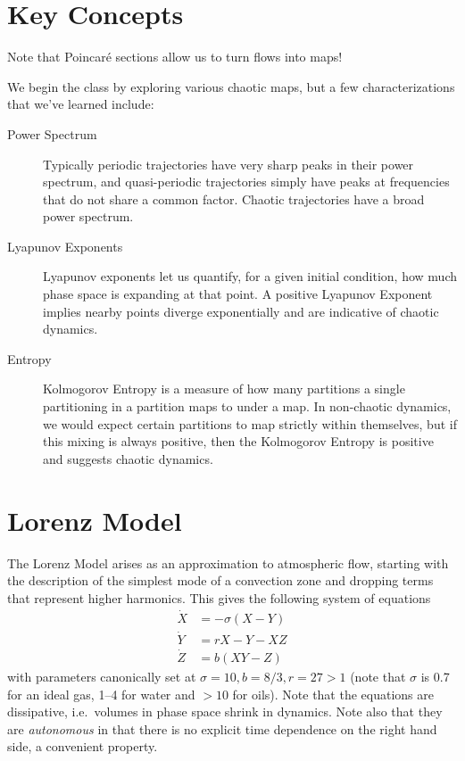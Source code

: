 \documentclass[10pt]{article}
\begin{document}
\pagestyle{fancy}
\cfoot{\thepage/\pageref{LastPage}}

\tableofcontents
\clearpage

\section{Key Concepts}

Note that Poincar\'e sections allow us to turn flows into maps!

We begin the class by exploring various chaotic maps, but a few
characterizations that we've learned include:
\begin{description}
    \item[Power Spectrum] Typically periodic trajectories have very sharp peaks
        in their power spectrum, and quasi-periodic trajectories simply have
        peaks at frequencies that do not share a common factor. Chaotic
        trajectories have a broad power spectrum.

    \item[Lyapunov Exponents] Lyapunov exponents let us quantify, for a given
        initial condition, how much phase space is expanding at that point. A
        positive Lyapunov Exponent implies nearby points diverge exponentially
        and are indicative of chaotic dynamics.

    \item[Entropy] Kolmogorov Entropy is a measure of how many partitions a
        single partitioning in a partition maps to under a map. In non-chaotic
        dynamics, we would expect certain partitions to map strictly within
        themselves, but if this mixing is always positive, then the Kolmogorov
        Entropy is positive and suggests chaotic dynamics.
\end{description}

\section{Lorenz Model}

The Lorenz Model arises as an approximation to atmospheric flow, starting with
the description of the simplest mode of a convection zone and dropping terms
that represent higher harmonics. This gives the following system of equations
\begin{align}
    \dot{X} &= -\sigma(X - Y) \nonumber\\
    \dot{Y} &= rX - Y - XZ \nonumber\\
    \dot{Z} &= b(XY - Z)
\end{align}
with parameters canonically set at $\sigma = 10, b = 8/3, r =27 > 1$ (note that
$\sigma$ is 0.7 for an ideal gas, 1--4 for water and $>10$ for oils). Note that
the equations are dissipative, i.e.\ volumes in phase space shrink in dynamics.
Note also that they are \emph{autonomous} in that there is no explicit time
dependence on the right hand side, a convenient property.
\end{document}
